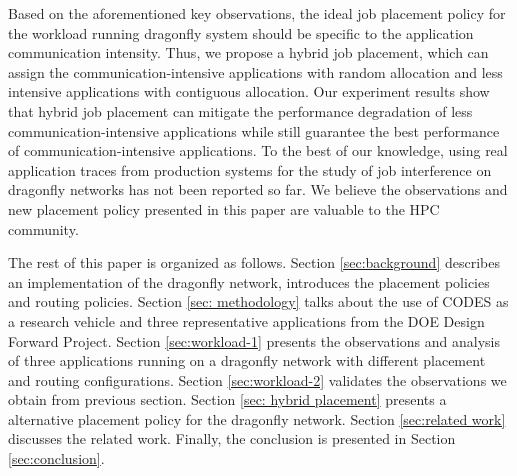Based on the aforementioned key observations, the ideal job placement policy for the workload running dragonfly system should be specific to the application communication intensity. Thus, we propose a hybrid job placement, which can assign the communication-intensive applications with random allocation and less intensive applications with contiguous allocation. Our experiment results show that hybrid job placement can mitigate the performance degradation of less communication-intensive applications while still guarantee the best performance of communication-intensive applications.
To the best of our knowledge, using real application traces from production systems for the study of job interference on dragonfly networks has not been reported so far. We believe the observations and new placement policy presented in this paper are valuable to the HPC community.


The rest of this paper is organized as follows. Section \ref{sec:background} describes an implementation of the dragonfly network, introduces the placement policies and routing policies. Section \ref{sec: methodology} talks about the use of CODES as a research vehicle and three representative applications from the DOE Design Forward Project. Section \ref{sec:workload-1} presents the observations and analysis of three applications running on a dragonfly network with different placement and routing configurations. Section \ref{sec:workload-2} validates the observations we obtain from previous section. Section \ref{sec: hybrid placement} presents a alternative placement policy for the dragonfly network. Section \ref{sec:related work} discusses the related work. Finally, the conclusion is presented in Section \ref{sec:conclusion}.


